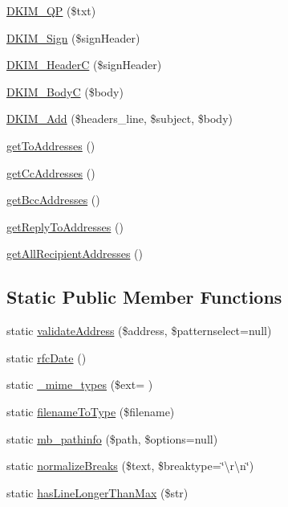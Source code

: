 \begin{DoxyCompactItemize}
\item 
\hyperlink{class_p_h_p_mailer_acec5422fbacb7c17671e613d5a3c6c47}{D\+K\+I\+M\+\_\+\+QP} (\$txt)
\item 
\hyperlink{class_p_h_p_mailer_aadcda1cd84010ce6e24880ef263581d7}{D\+K\+I\+M\+\_\+\+Sign} (\$sign\+Header)
\item 
\hyperlink{class_p_h_p_mailer_a9bcf728e9960a6512c5145a413cf86f5}{D\+K\+I\+M\+\_\+\+HeaderC} (\$sign\+Header)
\item 
\hyperlink{class_p_h_p_mailer_a59e764f699f678a6fa52ee089e941b1b}{D\+K\+I\+M\+\_\+\+BodyC} (\$body)
\item 
\hyperlink{class_p_h_p_mailer_a3d464b41f5f853bb29c83d8e74fe1470}{D\+K\+I\+M\+\_\+\+Add} (\$headers\+\_\+line, \$subject, \$body)
\item 
\hyperlink{class_p_h_p_mailer_a60d18c0fa7be86271d905e9d19cfc024}{get\+To\+Addresses} ()
\item 
\hyperlink{class_p_h_p_mailer_afb6cde741994ed21899d9988e4a27227}{get\+Cc\+Addresses} ()
\item 
\hyperlink{class_p_h_p_mailer_ae654887b031c19609bcff837ec51ce77}{get\+Bcc\+Addresses} ()
\item 
\hyperlink{class_p_h_p_mailer_aa3c2c989e01aaa5224c6913219f5053f}{get\+Reply\+To\+Addresses} ()
\item 
\hyperlink{class_p_h_p_mailer_a520c29b999a7ab6b1de74f2b25d0cf0b}{get\+All\+Recipient\+Addresses} ()
\end{DoxyCompactItemize}
\subsection*{Static Public Member Functions}
\begin{DoxyCompactItemize}
\item 
static \hyperlink{class_p_h_p_mailer_ab1751a18a24757fee7043fa3b055eb03}{validate\+Address} (\$address, \$patternselect=null)
\item 
static \hyperlink{class_p_h_p_mailer_a8977a3091a45017bb8454521deb71e83}{rfc\+Date} ()
\item 
static \hyperlink{class_p_h_p_mailer_add7b3e7830b61950b7a201f2d432289f}{\+\_\+mime\+\_\+types} (\$ext= \textquotesingle{}\textquotesingle{})
\item 
static \hyperlink{class_p_h_p_mailer_ac1a4d9403511e262d4723394052bf015}{filename\+To\+Type} (\$filename)
\item 
static \hyperlink{class_p_h_p_mailer_abefcc03813c15369c080f6361da33b90}{mb\+\_\+pathinfo} (\$path, \$options=null)
\item 
static \hyperlink{class_p_h_p_mailer_a0098c763eef87ec682208020c880ce71}{normalize\+Breaks} (\$text, \$breaktype=\char`\"{}\textbackslash{}r\textbackslash{}n\char`\"{})
\item 
static \hyperlink{class_p_h_p_mailer_adca6f1dc6f1ec34df1a9362cf1529030}{has\+Line\+Longer\+Than\+Max} (\$str)
\end{DoxyCompactItemize}
